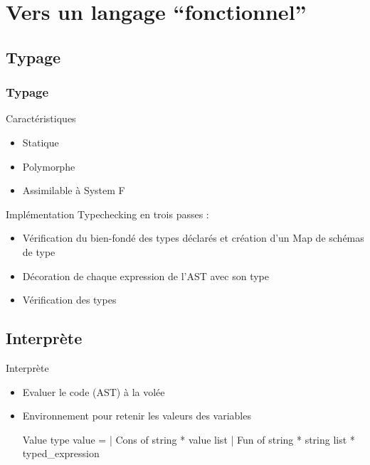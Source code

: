 \section{Vers un langage ``fonctionnel''}

\subsection{Typage}

\begin{frame}
  \frametitle{Typage}
  \begin{block}{Caractéristiques}
    \begin{itemize}
    \item Statique
    \item Polymorphe
    \item Assimilable à System F
    \end{itemize}
  \end{block}
  \begin{block}{Implémentation}
    Typechecking en trois passes :
    \begin{itemize}
      \item Vérification du bien-fondé des types déclarés et création d'un Map de schémas de type
      \item Décoration de chaque expression de l'AST avec son type
      \item Vérification des types
    \end{itemize}
  \end{block}
\end{frame}

\subsection{Interprète}

\begin{frame}{Interprète}
  \begin{itemize}
  \item Evaluer le code (AST) à la volée
  \item Environnement pour retenir les valeurs des variables
    \begin{block}{Value}
      type value =
      | Cons of string * value list
      | Fun of string * string list * typed\_expression
    \end{block}
  \end{itemize}
\end{frame}

